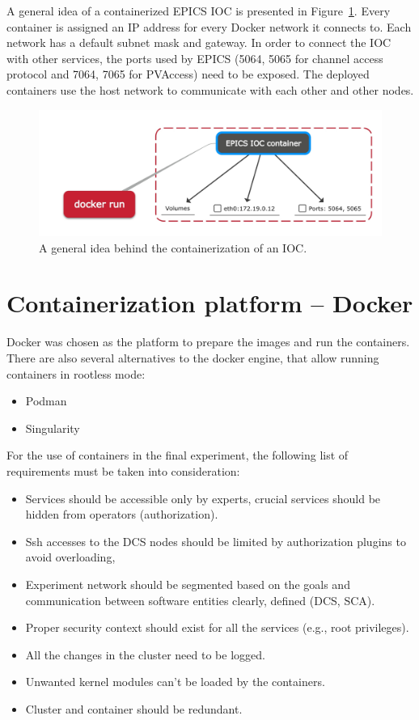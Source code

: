 A general idea of a containerized \gls{EPICS} \gls{IOC} is presented in Figure~\ref{fig_doc}. Every container is assigned an IP address for every Docker network it connects to. Each network has a default subnet mask and gateway. In order to connect the \gls{IOC} with other services, the ports used by \gls{EPICS} (5064, 5065 for channel access protocol and 7064, 7065 for PVAccess) need to be exposed.  The deployed containers use the host network to communicate with each other and other nodes.
\begin{figure}[!h]
\centering
\includegraphics[width=0.75\columnwidth]{Chapter4/images/docker_run.jpg}
\caption{A general idea behind the containerization of an \gls{IOC}.}
\label{fig_doc}
\end{figure}
\section{Containerization platform -- Docker}
Docker was chosen as the platform to prepare the images and run the containers. There are also several alternatives to the docker engine, that allow running containers in rootless mode:
\begin{itemize}
    \item Podman~\cite{Podman} 
    \item Singularity~\cite{singularity}
\end{itemize}

For the use of containers in the final experiment, the following list of requirements must be taken into consideration:

\begin{itemize}
    \item Services should be accessible only by experts, crucial services should be hidden from operators (authorization).
    \item Ssh accesses to the DCS nodes should be limited by authorization plugins to avoid overloading,
    \item Experiment network should be segmented based on the goals and communication between software entities clearly, defined (\gls{DCS}, \gls{SCA}).
    \item Proper security context should exist for all the services (e.g., root privileges).
    \item All the changes in the cluster need to be logged.
    \item Unwanted kernel modules can't be loaded by the containers.
    \item Cluster and container should be redundant.
\end{itemize}


